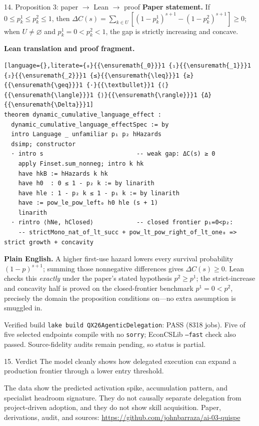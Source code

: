 \documentclass[aspectratio=169,10pt]{beamer}
\begin{document}
\begin{frame}[fragile]{14. Proposition 3: paper $\rightarrow$ Lean $\rightarrow$ proof}
\scriptsize
\textbf{Paper statement.} If $0\le p^1_k\le p^2_k\le1$, then
$\Delta C(s)=\sum_{k\in U}[(1-p^1_k)^{s+1}-(1-p^2_k)^{s+1}]\ge0$; when
$U\ne\varnothing$ and $p^1_k=0<p^2_k<1$, the gap is strictly increasing and concave.

\textbf{Lean translation and proof fragment.}
\begin{lstlisting}[language={},literate={₀}{{\ensuremath{_0}}}1 {₁}{{\ensuremath{_1}}}1 {₂}{{\ensuremath{_2}}}1 {≤}{{\ensuremath{\leq}}}1 {≥}{{\ensuremath{\geq}}}1 {·}{{\textbullet}}1 {⟨}{{\ensuremath{\langle}}}1 {⟩}{{\ensuremath{\rangle}}}1 {Δ}{{\ensuremath{\Delta}}}1]
theorem dynamic_cumulative_language_effect :
  dynamic_cumulative_language_effectSpec := by
  intro Language _ unfamiliar p₁ p₂ hHazards
  dsimp; constructor
  · intro s                          -- weak gap: ΔC(s) ≥ 0
    apply Finset.sum_nonneg; intro k hk
    have hkB := hHazards k hk
    have h0  : 0 ≤ 1 - p₂ k := by linarith
    have hle : 1 - p₂ k ≤ 1 - p₁ k := by linarith
    have := pow_le_pow_left₀ h0 hle (s + 1)
    linarith
  · rintro ⟨hNe, hClosed⟩            -- closed frontier p₁=0<p₂:
    -- strictMono_nat_of_lt_succ + pow_lt_pow_right_of_lt_one₀ => strict growth + concavity
\end{lstlisting}
\textbf{Plain English.} A higher first-use hazard lowers every survival
probability $(1-p)^{s+1}$; summing those nonnegative differences gives $\Delta C(s)\ge0$.
Lean checks this \emph{exactly} under the paper's stated hypothesis $p^2\ge p^1$; the
strict-increase and concavity half is proved on the closed-frontier benchmark $p^1=0<p^2$,
precisely the domain the proposition conditions on---no extra assumption is smuggled in.

\begin{block}{Verified build}
\texttt{lake build QX26AgenticDelegation}: PASS (8318 jobs). Five of five
selected endpoints compile with no \texttt{sorry}; EconCSLib \texttt{--fast}
check also passed. Source-fidelity audits remain pending, so status is partial.
\end{block}
\end{frame}

\begin{frame}{15. Verdict}
\Large
The model cleanly shows how delegated execution can expand a \alert{production} frontier through a lower entry threshold.
\vspace{.8em}

\normalsize
The data show the predicted activation spike, accumulation pattern, and specialist headroom signature. They do not causally separate delegation from project-driven adoption, and they do not show skill acquisition.
\vfill
\small Paper, derivations, audit, and sources: \url{https://github.com/johnbarraza/ai-03-quispe}
\end{frame}
\end{document}
